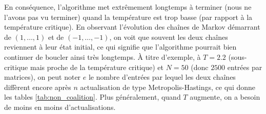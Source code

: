 \documentclass[a4paper,11pt]{article}
\begin{document}
En conséquence, l'algorithme met extrêmement longtemps à terminer (nous ne l'avons pas vu terminer) quand la température est trop basse (par rapport à la température critique). En observant l'évolution des chaînes de Markov démarrant de $(1,\hdots,1)$ et de $(-1,\hdots,-1)$, on voit que souvent les deux chaînes reviennent à leur état initial, ce qui signifie que l'algorithme pourrait bien continuer de boucler ainsi très longtemps. À titre d'exemple, à $T = 2.2$ (sous-critique mais proche de la température critique) et $N = 50$ (donc $2500$ entrées par matrices), on peut noter $e$ le nombre d'entrées par lequel les deux chaînes diffèrent encore après $n$ actualisation de type Metropolis-Hastings, ce qui donne les tables \ref{tab:non_coalition}. Plus généralement, quand $T$ augmente, on a besoin de moins en moins d'actualisations.
\begin{table}[!htbp]
	\label{tab:non_coalition}
	\centering
	\hfill
	\hfill
	\hfill
	\caption{Tentatives de coalition consécutives de l'algorithme de couplage par le passé par Metropolis-Hastings. Pour passer de $n$ à $2n$, on conserve les $n$ actualisation et on en ajoute $n$ nouvelles avant. $e$ est le nombre d'entrées différentes entre les deux chaînes à la fin de la tentative à $n$ fixé ($e \leq N^2 = 2500$, il y a coalition à $e = 0$)}
\end{table}
\end{document}
